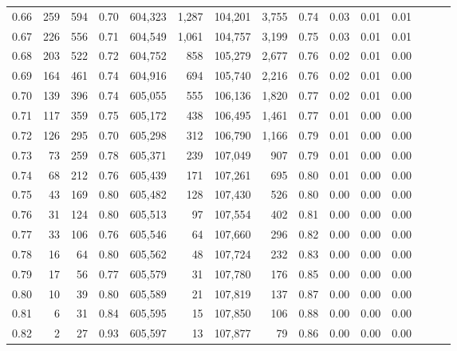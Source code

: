 \begin{tabular}{rrrrrrrrrrrrrrr}
0.66 &     259 &    594 &  0.70 &  604,323 &    1,287 &  104,201 &    3,755 &  0.74 &  0.03 &  0.01 &      0.01 \\
0.67 &     226 &    556 &  0.71 &  604,549 &    1,061 &  104,757 &    3,199 &  0.75 &  0.03 &  0.01 &      0.01 \\
0.68 &     203 &    522 &  0.72 &  604,752 &      858 &  105,279 &    2,677 &  0.76 &  0.02 &  0.01 &      0.00 \\
0.69 &     164 &    461 &  0.74 &  604,916 &      694 &  105,740 &    2,216 &  0.76 &  0.02 &  0.01 &      0.00 \\
0.70 &     139 &    396 &  0.74 &  605,055 &      555 &  106,136 &    1,820 &  0.77 &  0.02 &  0.01 &      0.00 \\
0.71 &     117 &    359 &  0.75 &  605,172 &      438 &  106,495 &    1,461 &  0.77 &  0.01 &  0.00 &      0.00 \\
0.72 &     126 &    295 &  0.70 &  605,298 &      312 &  106,790 &    1,166 &  0.79 &  0.01 &  0.00 &      0.00 \\
0.73 &      73 &    259 &  0.78 &  605,371 &      239 &  107,049 &      907 &  0.79 &  0.01 &  0.00 &      0.00 \\
0.74 &      68 &    212 &  0.76 &  605,439 &      171 &  107,261 &      695 &  0.80 &  0.01 &  0.00 &      0.00 \\
0.75 &      43 &    169 &  0.80 &  605,482 &      128 &  107,430 &      526 &  0.80 &  0.00 &  0.00 &      0.00 \\
0.76 &      31 &    124 &  0.80 &  605,513 &       97 &  107,554 &      402 &  0.81 &  0.00 &  0.00 &      0.00 \\
0.77 &      33 &    106 &  0.76 &  605,546 &       64 &  107,660 &      296 &  0.82 &  0.00 &  0.00 &      0.00 \\
0.78 &      16 &     64 &  0.80 &  605,562 &       48 &  107,724 &      232 &  0.83 &  0.00 &  0.00 &      0.00 \\
0.79 &      17 &     56 &  0.77 &  605,579 &       31 &  107,780 &      176 &  0.85 &  0.00 &  0.00 &      0.00 \\
0.80 &      10 &     39 &  0.80 &  605,589 &       21 &  107,819 &      137 &  0.87 &  0.00 &  0.00 &      0.00 \\
0.81 &       6 &     31 &  0.84 &  605,595 &       15 &  107,850 &      106 &  0.88 &  0.00 &  0.00 &      0.00 \\
0.82 &       2 &     27 &  0.93 &  605,597 &       13 &  107,877 &       79 &  0.86 &  0.00 &  0.00 &      0.00 \\

\end{tabular}
